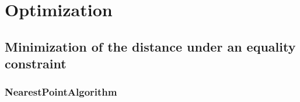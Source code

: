 \newpage
{}
\section{Optimization}

\subsection{Minimization of the distance under an equality constraint}

\subsubsection{NearestPointAlgorithm}

